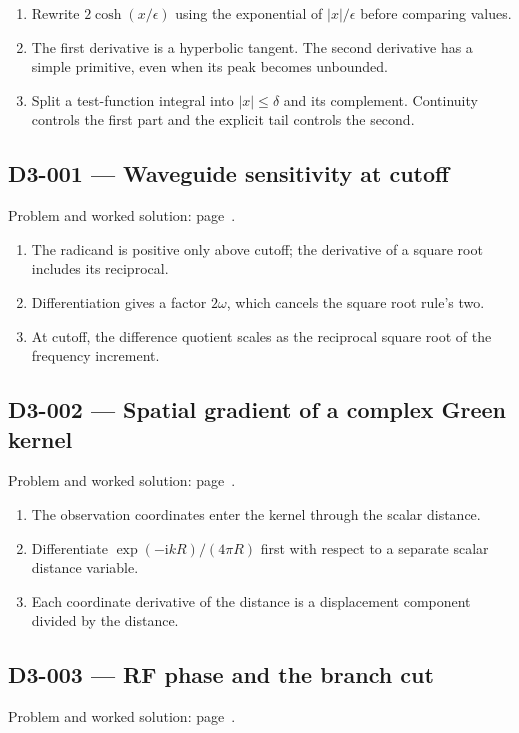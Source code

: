 \documentclass[11pt,oneside,openany]{book}
\begin{document}
\begin{enumerate}
\item Rewrite \(2\cosh(x/\epsilon)\) using the exponential of \(|x|/\epsilon\) before comparing values.
\item The first derivative is a hyperbolic tangent. The second derivative has a simple primitive, even when its peak becomes unbounded.
\item Split a test-function integral into \(|x|\le\delta\) and its complement. Continuity controls the first part and the explicit tail controls the second.
\end{enumerate}
\subsection*{D3-001 --- Waveguide sensitivity at cutoff}
\label{hints:D3-001}
Problem and worked solution: page~\pageref{problem:D3-001}.

\begin{enumerate}
\item The radicand is positive only above cutoff; the derivative of a square root includes its reciprocal.
\item Differentiation gives a factor \(2\omega\), which cancels the square root rule's two.
\item At cutoff, the difference quotient scales as the reciprocal square root of the frequency increment.
\end{enumerate}
\subsection*{D3-002 --- Spatial gradient of a complex Green kernel}
\label{hints:D3-002}
Problem and worked solution: page~\pageref{problem:D3-002}.

\begin{enumerate}
\item The observation coordinates enter the kernel through the scalar distance.
\item Differentiate \(\exp(-\mathrm{i}kR)/(4\pi R)\) first with respect to a separate scalar distance variable.
\item Each coordinate derivative of the distance is a displacement component divided by the distance.
\end{enumerate}
\subsection*{D3-003 --- RF phase and the branch cut}
\label{hints:D3-003}
Problem and worked solution: page~\pageref{problem:D3-003}.
\end{document}
